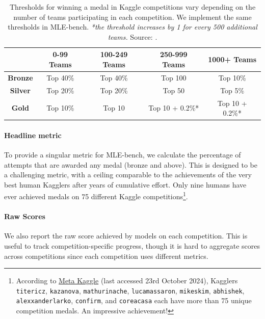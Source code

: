 \documentclass{article} %
\begin{document}
\begin{table}[ht]
    \centering
    \begin{tabular}{c c c c c}
        \toprule
        & \textbf{0-99 Teams} & \textbf{100-249 Teams} & \textbf{250-999 Teams} & \textbf{1000+ Teams} \\
        \midrule
        \textbf{Bronze} & Top 40\% & Top 40\% & Top 100 & Top 10\% \\
        \textbf{Silver} & Top 20\% & Top 20\% & Top 50 & Top 5\% \\
        \textbf{Gold} & Top 10\% & Top 10 & Top 10 + 0.2\%* & Top 10 + 0.2\%*  \\
        \bottomrule
    \end{tabular}
    \caption{Thresholds for winning a medal in Kaggle competitions vary depending on the number of teams participating in each competition. We implement the same thresholds in MLE-bench. \textit{*the threshold increases by 1 for every 500 additional teams.} Source: \citet{kaggle_kaggle_2024-1}.}
    \label{tab:kaggle_medal_thresholds}
\end{table}

\paragraph{Headline metric}
To provide a singular metric for MLE-bench, we calculate the percentage of attempts that are awarded any medal (bronze and above). This is designed to be a challenging metric, with a ceiling comparable to the achievements of the very best human Kagglers after years of cumulative effort. Only nine humans have ever achieved medals on 75 different Kaggle competitions\footnote{According to \href{https://www.kaggle.com/datasets/kaggle/meta-kaggle}{Meta Kaggle} (last accessed 23rd October 2024), Kagglers \texttt{titericz}, \texttt{kazanova}, \texttt{mathurinache}, \texttt{lucamassaron}, \texttt{mikeskim}, \texttt{abhishek}, \texttt{alexxanderlarko}, \texttt{confirm}, and \texttt{coreacasa} each have more than 75 unique competition medals. An impressive achievement!}.

\paragraph{Raw Scores}
We also report the raw score achieved by models on each competition. This is useful to track competition-specific progress, though it is hard to aggregate scores across competitions since each competition uses different metrics.
\end{document}

